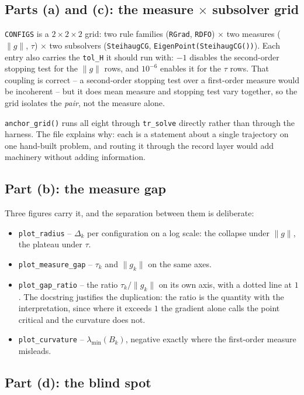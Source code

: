 \documentclass[11pt,a4paper]{article}
\newcommand{\jl}[1]{\texttt{\small #1}}
\newcommand{\gnorm}{\lVert g\rVert}
\newcommand{\gk}{\lVert g_k\rVert}
\begin{document}
\subsection{Parts (a) and (c): the measure $\times$ subsolver grid}

\jl{CONFIGS} is a $2\times2\times2$ grid: two rule families (\jl{RGrad},
\jl{RDFO}) $\times$ two measures ($\gnorm$, $\tau$) $\times$ two subsolvers
(\jl{SteihaugCG}, \jl{EigenPoint(SteihaugCG())}). Each entry also carries the
\jl{tol\_H} it should run with: $-1$ disables the second-order stopping test for
the $\gnorm$ rows, and $10^{-6}$ enables it for the $\tau$ rows. That coupling is
correct -- a second-order stopping test over a first-order measure would be
incoherent -- but it does mean measure and stopping test vary together, so the grid
isolates the \emph{pair}, not the measure alone.

\jl{anchor\_grid()} runs all eight through \jl{tr\_solve} directly rather than
through the harness. The file explains why: each is a statement about a single
trajectory on one hand-built problem, and routing it through the record layer would
add machinery without adding information.

\subsection{Part (b): the measure gap}

Three figures carry it, and the separation between them is deliberate:

\begin{itemize}[leftmargin=6mm,itemsep=2pt]
  \item \jl{plot\_radius} -- $\Delta_k$ per configuration on a log scale: the
        collapse under $\gnorm$, the plateau under $\tau$.
  \item \jl{plot\_measure\_gap} -- $\tau_k$ and $\gk$ on the same axes.
  \item \jl{plot\_gap\_ratio} -- the ratio $\tau_k/\gk$ on its own axis, with a
        dotted line at $1$. The docstring justifies the duplication: the ratio is
        the quantity with the interpretation, since where it exceeds $1$ the
        gradient alone calls the point critical and the curvature does not.
  \item \jl{plot\_curvature} -- $\lambda_{\min}(B_k)$, negative exactly where the
        first-order measure misleads.
\end{itemize}

\subsection{Part (d): the blind spot}
\end{document}
